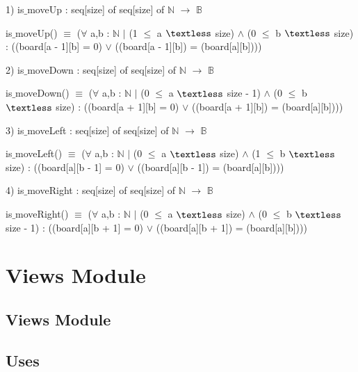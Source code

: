 \documentclass[12pt]{article}
\begin{document}
1) is$\_$moveUp : seq[size] of seq[size] of $\mathbb{N}$ $\rightarrow$ $\mathbb{B}$ 

\medskip
\begin{flushleft}
\noindent is$\_$moveUp() $\equiv$  ($\forall$ a,b :  $\mathbb{N}$ $\mid$ (1 $\le$ a $\textless$ size) $\land$ (0 $\le$ b $\textless$ size)   : ((board[a - 1][b] = 0) $\lor$ ((board[a - 1][b]) = (board[a][b])))\\
\end{flushleft}
2) is$\_$moveDown : seq[size] of seq[size] of $\mathbb{N}$ $\rightarrow$ $\mathbb{B}$ 

\medskip
\begin{flushleft}
\noindent is$\_$moveDown() $\equiv$  ($\forall$ a,b :  $\mathbb{N}$ $\mid$ (0 $\le$ a $\textless$ size - 1) $\land$ (0 $\le$ b $\textless$ size)   : ((board[a + 1][b] = 0) $\lor$ ((board[a + 1][b]) = (board[a][b])))\\
\end{flushleft}
3) is$\_$moveLeft : seq[size] of seq[size] of $\mathbb{N}$ $\rightarrow$ $\mathbb{B}$ 

\medskip
\begin{flushleft}
\noindent is$\_$moveLeft() $\equiv$  ($\forall$ a,b :  $\mathbb{N}$ $\mid$ (0 $\le$ a $\textless$ size) $\land$ (1 $\le$ b $\textless$ size)   : ((board[a][b - 1] = 0) $\lor$ ((board[a][b - 1]) = (board[a][b])))\\
\end{flushleft}
4) is$\_$moveRight : seq[size] of seq[size] of $\mathbb{N}$ $\rightarrow$ $\mathbb{B}$ 

\medskip
\begin{flushleft}
\noindent is$\_$moveRight() $\equiv$  ($\forall$ a,b :  $\mathbb{N}$ $\mid$ (0 $\le$ a $\textless$ size) $\land$ (0 $\le$ b $\textless$ size - 1)   : ((board[a][b + 1] = 0) $\lor$ ((board[a][b + 1]) = (board[a][b])))\\
\end{flushleft}


\newpage

\section* {Views Module}

\subsection* {Views Module}

\subsection* {Uses}
\end{document}

